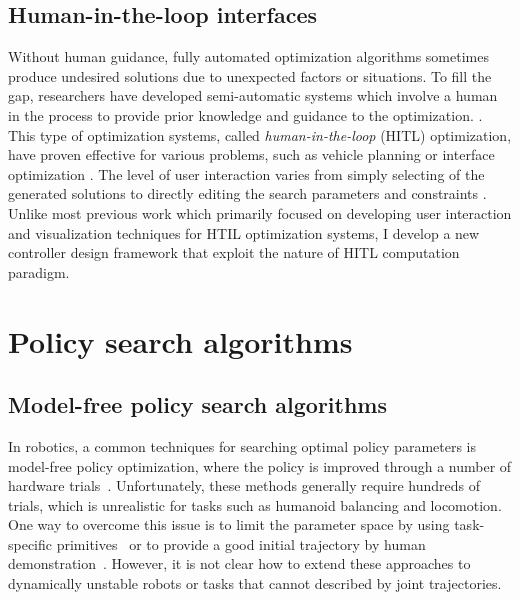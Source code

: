 \subsection{Human-in-the-loop interfaces}
Without human guidance, fully automated optimization algorithms
sometimes produce undesired solutions due to unexpected factors or
situations. To fill the gap, researchers have developed
semi-automatic systems which involve a human in the process to provide
prior knowledge and guidance to the
optimization.
\cite{Scott:2002:IHC}. 
This type of optimization systems, called \emph{human-in-the-loop} (HITL)
optimization, have proven effective for various problems, such as
vehicle planning \cite{Waters:1984:IVR} or interface optimization
\cite{Quiroz:2007:IEX}.  The level of user interaction
varies from simply selecting of the generated solutions
\cite{Sims:1991:AEC} to directly editing the search parameters and
constraints \cite{Sreevalsan-Nair:2007:HGE}. Unlike
most previous work which primarily focused on developing user
interaction and visualization techniques for HTIL optimization
systems, I develop a new controller design framework that exploit the nature of
HITL computation paradigm.

\section{Policy search algorithms}
\label{sec:related_policy}

\subsection{Model-free policy search algorithms}
In robotics, a common techniques for searching optimal policy parameters is 
model-free policy optimization, 
where the policy is improved through a number of hardware 
trials~\cite{bib-morimoto-standup,bib-kober-primitives}.
Unfortunately, these methods generally require hundreds of
trials, which is unrealistic for tasks such as humanoid balancing and
locomotion.
One way to overcome this issue is to limit the parameter space by using
task-specific primitives~\cite{bib-nakanishi-adaptation} or to provide a
good initial trajectory by human
demonstration~\cite{bib-atkeson-demonstration}.
However, it is not clear how to extend these approaches to dynamically
unstable robots or tasks that cannot described by joint trajectories.

